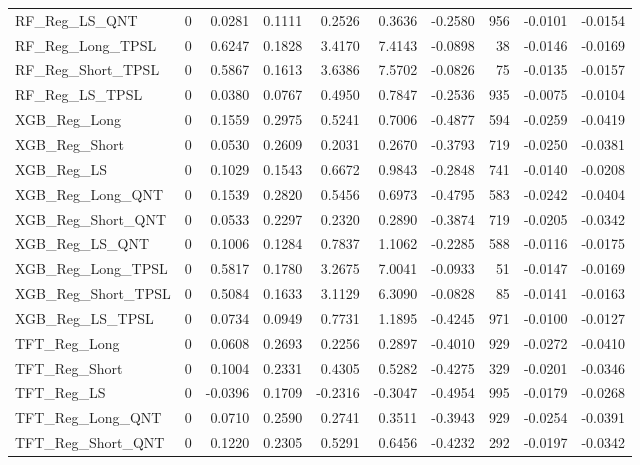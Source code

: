 \begin{tabular}{llrrrrrrrr}
\cline{1-10}
RF\_Reg\_LS\_QNT & 0 & 0.0281 & 0.1111 & 0.2526 & 0.3636 & -0.2580 & 956 & -0.0101 & -0.0154 \\
\cline{1-10}
RF\_Reg\_Long\_TPSL & 0 & 0.6247 & 0.1828 & 3.4170 & 7.4143 & -0.0898 & 38 & -0.0146 & -0.0169 \\
\cline{1-10}
RF\_Reg\_Short\_TPSL & 0 & 0.5867 & 0.1613 & 3.6386 & 7.5702 & -0.0826 & 75 & -0.0135 & -0.0157 \\
\cline{1-10}
RF\_Reg\_LS\_TPSL & 0 & 0.0380 & 0.0767 & 0.4950 & 0.7847 & -0.2536 & 935 & -0.0075 & -0.0104 \\
\cline{1-10}
XGB\_Reg\_Long & 0 & 0.1559 & 0.2975 & 0.5241 & 0.7006 & -0.4877 & 594 & -0.0259 & -0.0419 \\
\cline{1-10}
XGB\_Reg\_Short & 0 & 0.0530 & 0.2609 & 0.2031 & 0.2670 & -0.3793 & 719 & -0.0250 & -0.0381 \\
\cline{1-10}
XGB\_Reg\_LS & 0 & 0.1029 & 0.1543 & 0.6672 & 0.9843 & -0.2848 & 741 & -0.0140 & -0.0208 \\
\cline{1-10}
XGB\_Reg\_Long\_QNT & 0 & 0.1539 & 0.2820 & 0.5456 & 0.6973 & -0.4795 & 583 & -0.0242 & -0.0404 \\
\cline{1-10}
XGB\_Reg\_Short\_QNT & 0 & 0.0533 & 0.2297 & 0.2320 & 0.2890 & -0.3874 & 719 & -0.0205 & -0.0342 \\
\cline{1-10}
XGB\_Reg\_LS\_QNT & 0 & 0.1006 & 0.1284 & 0.7837 & 1.1062 & -0.2285 & 588 & -0.0116 & -0.0175 \\
\cline{1-10}
XGB\_Reg\_Long\_TPSL & 0 & 0.5817 & 0.1780 & 3.2675 & 7.0041 & -0.0933 & 51 & -0.0147 & -0.0169 \\
\cline{1-10}
XGB\_Reg\_Short\_TPSL & 0 & 0.5084 & 0.1633 & 3.1129 & 6.3090 & -0.0828 & 85 & -0.0141 & -0.0163 \\
\cline{1-10}
XGB\_Reg\_LS\_TPSL & 0 & 0.0734 & 0.0949 & 0.7731 & 1.1895 & -0.4245 & 971 & -0.0100 & -0.0127 \\
\cline{1-10}
TFT\_Reg\_Long & 0 & 0.0608 & 0.2693 & 0.2256 & 0.2897 & -0.4010 & 929 & -0.0272 & -0.0410 \\
\cline{1-10}
TFT\_Reg\_Short & 0 & 0.1004 & 0.2331 & 0.4305 & 0.5282 & -0.4275 & 329 & -0.0201 & -0.0346 \\
\cline{1-10}
TFT\_Reg\_LS & 0 & -0.0396 & 0.1709 & -0.2316 & -0.3047 & -0.4954 & 995 & -0.0179 & -0.0268 \\
\cline{1-10}
TFT\_Reg\_Long\_QNT & 0 & 0.0710 & 0.2590 & 0.2741 & 0.3511 & -0.3943 & 929 & -0.0254 & -0.0391 \\
\cline{1-10}
TFT\_Reg\_Short\_QNT & 0 & 0.1220 & 0.2305 & 0.5291 & 0.6456 & -0.4232 & 292 & -0.0197 & -0.0342 \\

\end{tabular}
